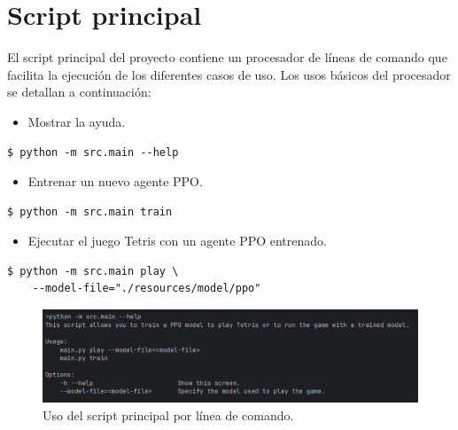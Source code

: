 
\chapter{Script principal} %

\label{Script principal}

El script principal del proyecto contiene un procesador de líneas de comando que facilita la ejecución de los diferentes casos de uso. Los usos básicos del procesador se detallan a continuación:

\begin{itemize}
    \item Mostrar la ayuda.
\end{itemize}
\begin{verbatim}
$ python -m src.main --help
\end{verbatim}

\begin{itemize}
    \item Entrenar un nuevo agente PPO.
\end{itemize}
\begin{verbatim}
$ python -m src.main train
\end{verbatim}

\begin{itemize}
    \item Ejecutar el juego Tetris con un agente PPO entrenado.
\end{itemize}
\begin{verbatim}
$ python -m src.main play \
    --model-file="./resources/model/ppo"
\end{verbatim}

\begin{figure}[htbp]
	\centering
	\includegraphics[width=\textwidth]{./Figures/command.png}
	\caption{Uso del script principal por línea de comando.}
	\label{fig:command}
\end{figure}